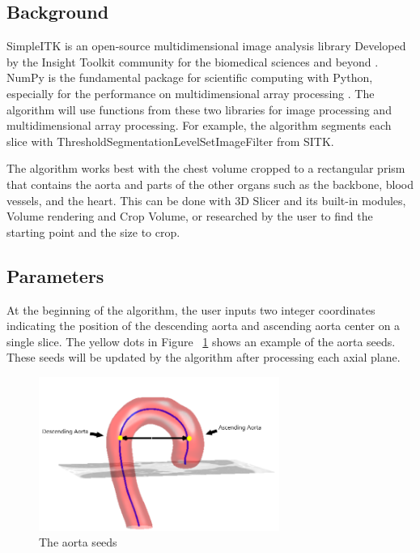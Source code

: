 \subsection{Background} \label{algo_bg}

SimpleITK is an open-source multidimensional image analysis library Developed by the Insight Toolkit community for the biomedical sciences and beyond \cite{JSSv086i08}\cite{10.3389/fninf.2013.00045}. NumPy is the fundamental package for scientific computing with Python, especially for the performance on multidimensional array processing \cite{harris2020array}. The algorithm will use functions from these two libraries for image processing and multidimensional array processing. For example, the algorithm segments each slice with ThresholdSegmentationLevelSetImageFilter from SITK.

The algorithm works best with the chest volume cropped to a rectangular prism that contains the aorta and parts of the other organs such as the backbone, blood vessels, and the heart. This can be done with 3D Slicer and its built-in modules, Volume rendering and Crop Volume, or researched by the user to find the starting point and the size to crop.

\subsection{Parameters}

At the beginning of the algorithm, the user inputs two integer coordinates indicating the position of the descending aorta and ascending aorta center on a single slice. The yellow dots in Figure ~\ref{fig_aorta_seed} shows an example of the aorta seeds. These seeds will be updated by the algorithm after processing each axial plane.

\begin{figure}[ht]
    \centering
    \includegraphics[width=0.7\textwidth]{figures/Sample/Aorta_seeds.png}
    \caption[The Aorta Seeds]{The aorta seeds \citep{6346433}}
    \label{fig_aorta_seed}
\end{figure}

